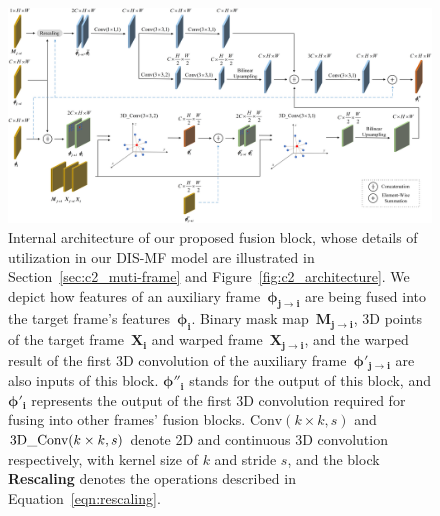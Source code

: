 \begin{figure}[t]
    \begin{center}
        \includegraphics[width=1.0\linewidth]{images/chapter2/figures/Fig2.jpg}
    \end{center}
   \caption{Internal architecture of our proposed fusion block, whose details of utilization in our DIS-MF model are illustrated in Section~\ref{sec:c2_muti-frame} and Figure~\ref{fig:c2_architecture}. We depict how features of an auxiliary frame~$\boldsymbol{\phi_{j \rightarrow i}}$ are being fused into the target frame's features~$\boldsymbol{\phi_{i}}$. Binary mask map~$\boldsymbol{M_{j \rightarrow i}}$, 3D points of the target frame~$\boldsymbol{X_{i}}$ and warped frame~$\boldsymbol{X_{j \rightarrow i}}$, and the warped result of the first 3D convolution of the auxiliary frame~$\boldsymbol{\phi'_{j \rightarrow i}}$ are also inputs of this block. $\boldsymbol{\phi''_{i}}$ stands for the output of this block, and $\boldsymbol{\phi'_{i}}$ represents the output of the first 3D convolution required for fusing into other frames' fusion blocks. $\text{Conv}(k \times k, s)$ and $\text{3D\textunderscore Conv}(k \times k, s)$ denote 2D and continuous 3D convolution respectively, with kernel size of $k$ and stride $s$, and the block \textbf{Rescaling} denotes the operations described in Equation~\eqref{eqn:rescaling}.}
    \label{fig:c2_fusion}
\end{figure}

